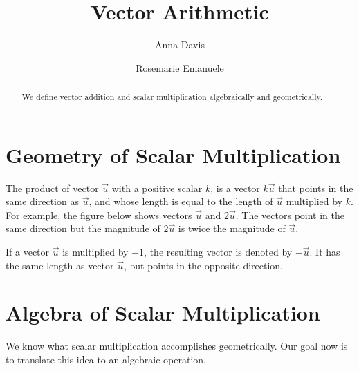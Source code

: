 \documentclass{ximera}
\author{Anna Davis \and Rosemarie Emanuele} \title{Vector Arithmetic} \license{CC-BY 4.0}
\begin{document}
\begin{abstract}
 We define vector addition and scalar multiplication algebraically and geometrically.
\end{abstract}
\maketitle



\section*{Geometry of Scalar Multiplication} The product of vector $\vec{u}$ with a positive scalar $k$, is a vector $k\vec{u}$ that points in the same direction as $\vec{u}$, and whose length  is equal to the length of $\vec{u}$ multiplied by $k$. For example, the figure below shows vectors $\vec{u}$ and $2\vec{u}$.  The vectors point in the same direction but the magnitude of $2\vec{u}$ is twice the magnitude of $\vec{u}$.

\begin{image}[1.5in]
\end{image}


If a vector $\vec{u}$ is multiplied by $-1$, the resulting vector is denoted by $-\vec{u}$.  It has the same length as vector $\vec{u}$, but points in the opposite direction.

\begin{image}[0.8in]
\end{image}



\section*{Algebra of Scalar Multiplication}
We know what scalar multiplication accomplishes geometrically.  Our goal now is to translate this idea to an algebraic operation.  
\end{document}
